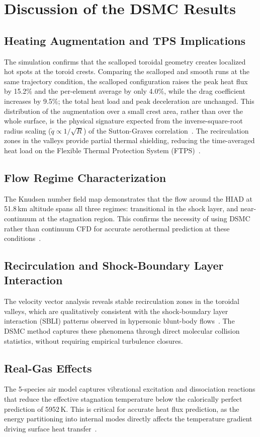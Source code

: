 \section{Discussion of the DSMC Results}

\subsection{Heating Augmentation and TPS Implications}
The simulation confirms that the scalloped toroidal geometry creates localized hot spots at the toroid crests. Comparing the scalloped and smooth runs at the same trajectory condition, the scalloped configuration raises the peak heat flux by 15.2\% and the per-element average by only 4.0\%, while the drag coefficient increases by 9.5\%; the total heat load and peak deceleration are unchanged. This distribution of the augmentation over a small crest area, rather than over the whole surface, is the physical signature expected from the inverse-square-root radius scaling ($\dot{q} \propto 1/\sqrt{R}$) of the Sutton-Graves correlation~\cite{sutton1971gravesh}. The recirculation zones in the valleys provide partial thermal shielding, reducing the time-averaged heat load on the Flexible Thermal Protection System (FTPS)~\cite{hollis2018surface}.

\subsection{Flow Regime Characterization}
The Knudsen number field map demonstrates that the flow around the HIAD at 51.8\,km altitude spans all three regimes: transitional in the shock layer, and near-continuum at the stagnation region. This confirms the necessity of using DSMC rather than continuum CFD for accurate aerothermal prediction at these conditions~\cite{mos2006lowdensity}.

\subsection{Recirculation and Shock-Boundary Layer Interaction}
The velocity vector analysis reveals stable recirculation zones in the toroidal valleys, which are qualitatively consistent with the shock-boundary layer interaction (SBLI) patterns observed in hypersonic blunt-body flows~\cite{guo2019hypersonic}. The DSMC method captures these phenomena through direct molecular collision statistics, without requiring empirical turbulence closures.

\subsection{Real-Gas Effects}
The 5-species air model captures vibrational excitation and dissociation reactions that reduce the effective stagnation temperature below the calorically perfect prediction of 5952\,K. This is critical for accurate heat flux prediction, as the energy partitioning into internal modes directly affects the temperature gradient driving surface heat transfer~\cite{AndersonHypersonic}.

